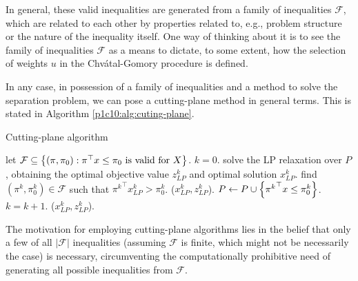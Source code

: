 In general, these valid inequalities are generated from a family of inequalities $\mathcal{F}$, which are related to each other by properties related to, e.g., problem structure or the nature of the inequality itself. One way of thinking about it is to see the family of inequalities $\mathcal{F}$ as a means to dictate, to some extent, how the selection of weights $u$ in the Chv\'atal-Gomory procedure is defined.

In any case, in possession of a family of inequalities and a method to solve the separation problem, we can pose a cutting-plane method in general terms. This is stated in Algorithm \ref{p1c10:alg:cuting-plane}.

\begin{algorithm}[h]
	\caption{Cutting-plane algorithm} \label{p1c10:alg:cuting-plane}
	\begin{algorithmic}[1] %
		 let $\mathcal{F} \subseteq \left\{ (\pi, \pi_0) : \pi^\top  x \leq \pi_0 \text{ is valid for } X \right \}$. $k = 0$. 
		 \label{Alg2:loop}
		    \State solve the LP relaxation over $P$, obtaining the optimal objective value $z_{LP}^k$ and optimal solution $x_{LP}^k$. 
		        find $(\pi^k, \pi^k_0) \in \mathcal{F}$ such that ${\pi^k}^\top x_{LP}^k > \pi^k_0$. \label{Alg2:SepProb}
		    \Else 
		    	 ($x_{LP}^k, z_{LP}^k$).
		    \EndIf
		    \State $P \gets P \cup \left\{ {\pi^k}^\top x \leq \pi^k_0 \right \}$. $k = k+1$.
		\EndWhile
	     ($x_{LP}^k, z_{LP}^k$).
	\end{algorithmic}
\end{algorithm}


The motivation for employing cutting-plane algorithms lies in the belief that only a few of all $|\mathcal{F}|$ inequalities (assuming $\mathcal{F}$ is finite, which might not be necessarily the case) is necessary, circumventing the computationally prohibitive need of generating all possible inequalities from $\mathcal{F}$.

